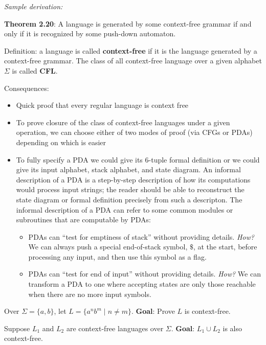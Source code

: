 \documentclass[12pt, oneside]{article}
\begin{document}
  {\it Sample derivation:} 
  
  \vspace{30pt}

\newpage

{\bf Theorem  2.20}: A language is  generated by some context-free  grammar
if  and only if it is recognized by some push-down automaton.

Definition: a language is called {\bf context-free} if it is the language generated by a context-free grammar.
The class of all context-free language over a given alphabet $\Sigma$ is called {\bf CFL}.

Consequences:
\begin{itemize}
    \item Quick proof that every regular language is context free 
    \item To prove closure of the class of context-free languages under a given operation, we can choose 
    either of two modes 
    of proof (via CFGs or PDAs) depending on which is easier
    \item To fully specify a PDA we could give its $6$-tuple formal definition or we could give its input 
alphabet, stack alphabet, and state diagram.
An informal description of a PDA is a step-by-step description of how its computations 
would process input strings; the reader should be able to reconstruct the state diagram or formal 
definition precisely from such a descripton. The informal description of a PDA can refer to some 
common modules or subroutines that are computable by PDAs:
\begin{itemize}
  \item PDAs can ``test for emptiness of stack'' without providing details. 
  {\it How?} We can always push a special end-of-stack symbol, $\$$, at the start, before processing
  any input, and then use this symbol as a flag.
  \item PDAs can ``test for end of input'' without providing details.
  {\it How?} We can transform a PDA to one where accepting states are only those reachable 
  when there are no more input symbols.
\end{itemize}

\end{itemize}


Over $\Sigma = \{a,b\}$, let $L = \{ a^n b^m \mid n  \neq m \}$. {\bf Goal}: Prove $L$ is context-free.


\vfill

\newpage
Suppose $L_1$ and $L_2$ are context-free languages over $\Sigma$.  {\bf Goal}:  $L_1 \cup L_2$  is  also context-free.
\end{document}
